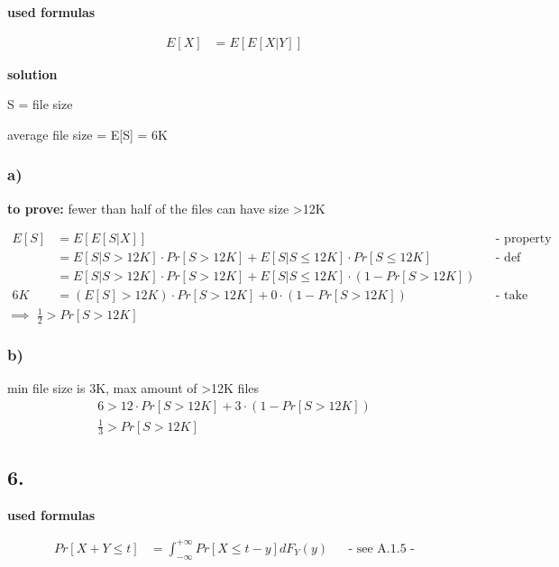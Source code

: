 \textbf{used formulas}

\begin{align*}
E\left[X\right]&=E\left[E\left[X|Y\right]\right]
\end{align*}

\textbf{solution}

S = file size

average file size =  E[S] = 6K

\subsubsection*{ a) }
\textbf{to prove:} fewer than half of the files can have size \textgreater  12K

\begin{align*}
E\left[S\right]&=E\left[E\left[S|X\right]\right]&& \text{-  property conditional expectation -}\\
&=E\left[S|S> 12K\right]\cdot Pr\left[S> 12K\right]+E\left[S|S\le 12K\right]\cdot Pr\left[S\le 12K\right]&& \text{-  def expectation -}\\
&=E\left[S|S> 12K\right]\cdot Pr\left[S> 12K\right]+E\left[S|S\le 12K\right]\cdot \left(1-Pr\left[S> 12K\right]\right)\\
6K&=\left(E\left[S\right]> 12K\right)\cdot Pr\left[S> 12K\right]+0\cdot \left(1-Pr\left[S> 12K\right]\right)&& \text{-  take lower bound -}
\end{align*}
$\implies$ $\frac{1}{2}> Pr\left[S> 12K\right]$

\subsubsection*{ b) }
min file size is 3K, max amount of \textgreater 12K files
\begin{align*}
6> 12\cdot Pr\left[S> 12K\right]+3\cdot \left(1-Pr\left[S> 12K\right]\right)\\
\frac{1}{3}> Pr\left[S> 12K\right]
\end{align*}

\subsection*{ 6. }

\textbf{used formulas}

\begin{align*}
Pr\left[X+Y\le t\right] &=\int _{{-\infty }}^{{+\infty }}Pr\left[X\le t-y\right]dF_{Y}\left(y\right) && \text{- see A.1.5 -}
\end{align*}

